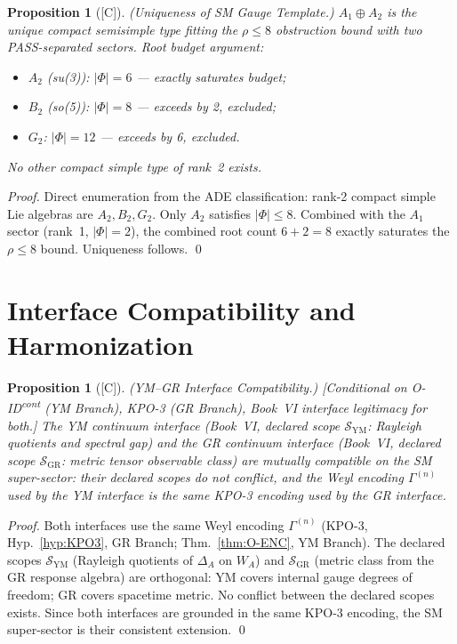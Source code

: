 \documentclass[12pt,oneside]{amsbook}
\theoremstyle{plain}
\newtheorem{proposition}[theorem]{Proposition}
\theoremstyle{definition}
\theoremstyle{remark}
\newcommand{\status}[1]{\textup{[#1]}}
\begin{document}
\begin{proposition}[\status{C}]\label{prop:SM-gauge-unique}
\textup{(Uniqueness of SM Gauge Template.)}
$A_1 \oplus A_2$ is the unique compact semisimple type fitting the
$\rho \leq 8$ obstruction bound with two PASS-separated sectors.
Root budget argument:
\begin{itemize}
 \item $A_2$ (su(3)): $|\Phi| = 6$ --- exactly saturates budget;
 \item $B_2$ (so(5)): $|\Phi| = 8$ --- exceeds by 2, excluded;
 \item $G_2$: $|\Phi| = 12$ --- exceeds by 6, excluded.
\end{itemize}
No other compact simple type of rank~2 exists.
\end{proposition}

\begin{proof}
Direct enumeration from the ADE classification: rank-2 compact
simple Lie algebras are $A_2, B_2, G_2$. Only $A_2$ satisfies
$|\Phi| \leq 8$. Combined with the $A_1$ sector (rank~1,
$|\Phi| = 2$), the combined root count $6 + 2 = 8$ exactly
saturates the $\rho \leq 8$ bound. Uniqueness follows. \qed
\end{proof}

\section{Interface Compatibility and Harmonization}
\label{sec:sm-interface}

\begin{proposition}[\status{C}]\label{prop:SM-interface-compat}
\textup{(YM--GR Interface Compatibility.)}
\textup{[Conditional on O-ID\textsuperscript{cont} (YM Branch),
KPO-3 (GR Branch), Book~VI interface legitimacy for both.]}
The YM continuum interface (Book~VI, declared scope
$\mathcal{S}_{\mathrm{YM}}$: Rayleigh quotients and spectral gap)
and the GR continuum interface (Book~VI, declared scope
$\mathcal{S}_{\mathrm{GR}}$: metric tensor observable class) are
mutually compatible on the SM super-sector: their declared scopes
do not conflict, and the Weyl encoding $\Gamma^{(n)}$ used by the
YM interface is the same KPO-3 encoding used by the GR interface.
\end{proposition}

\begin{proof}
Both interfaces use the same Weyl encoding $\Gamma^{(n)}$ (KPO-3,
Hyp.~\ref{hyp:KPO3}, GR Branch; Thm.~\ref{thm:O-ENC}, YM Branch).
The declared scopes $\mathcal{S}_{\mathrm{YM}}$ (Rayleigh quotients
of $\Delta_A$ on $W_A$) and $\mathcal{S}_{\mathrm{GR}}$ (metric
class from the GR response algebra) are orthogonal: YM covers
internal gauge degrees of freedom; GR covers spacetime metric.
No conflict between the declared scopes exists.
Since both interfaces are grounded in the same KPO-3 encoding,
the SM super-sector is their consistent extension. \qed
\end{proof}
\end{document}

